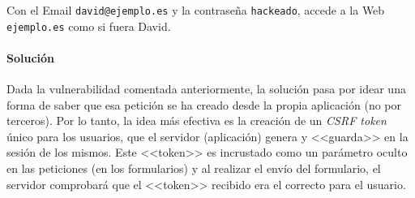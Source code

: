 \begin{tcolorbox}[colback=red!5!white,colframe=red!75!black,title=Atacante]

Con el Email \texttt{david@ejemplo.es} y la contraseña \texttt{hackeado}, accede
a la Web \texttt{ejemplo.es} como si fuera David.

\end{tcolorbox}

\paragraph{Solución} Dada la vulnerabilidad comentada anteriormente, la solución
pasa por idear una forma de saber que esa petición se ha creado desde la propia
aplicación (no por terceros). Por lo tanto, la idea más efectiva es la creación
de un \emph{CSRF token} único para los usuarios, que el servidor
(aplicación) genera y <<guarda>> en la sesión de los mismos. Este <<token>> es
incrustado como un parámetro oculto en las peticiones (en los formularios) y al
realizar el envío del formulario, el servidor comprobará que el <<token>>
recibido era el correcto para el usuario.

